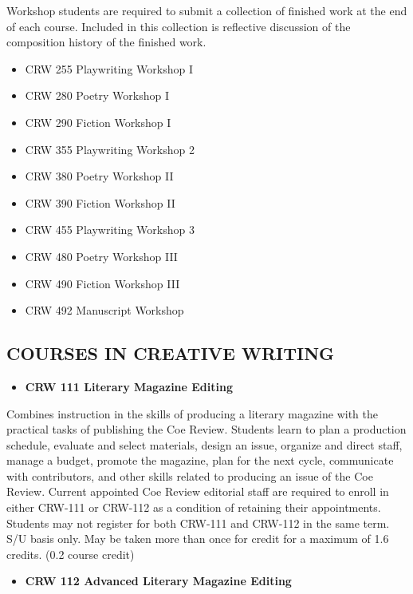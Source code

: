 \documentclass[
  letterpaper,
]{scrbook}
\providecommand{\tightlist}{%
  \setlength{\itemsep}{0pt}\setlength{\parskip}{0pt}}
\begin{document}
Workshop students are required to submit a collection of finished work
at the end of each course. Included in this collection is reflective
discussion of the composition history of the finished work.

\begin{itemize}
\tightlist
\item
  CRW 255 Playwriting Workshop I
\item
  CRW 280 Poetry Workshop I
\item
  CRW 290 Fiction Workshop I
\item
  CRW 355 Playwriting Workshop 2
\item
  CRW 380 Poetry Workshop II
\item
  CRW 390 Fiction Workshop II
\item
  CRW 455 Playwriting Workshop 3
\item
  CRW 480 Poetry Workshop III
\item
  CRW 490 Fiction Workshop III
\item
  CRW 492 Manuscript Workshop
\end{itemize}

\subsection{COURSES IN CREATIVE
WRITING}\label{sec-courses-in-creative-writing}

\begin{itemize}
\tightlist
\item
  \textbf{CRW 111 Literary Magazine Editing}
\end{itemize}

Combines instruction in the skills of producing a literary magazine with
the practical tasks of publishing the Coe Review. Students learn to plan
a production schedule, evaluate and select materials, design an issue,
organize and direct staff, manage a budget, promote the magazine, plan
for the next cycle, communicate with contributors, and other skills
related to producing an issue of the Coe Review. Current appointed Coe
Review editorial staff are required to enroll in either CRW-111 or
CRW-112 as a condition of retaining their appointments. Students may not
register for both CRW-111 and CRW-112 in the same term. S/U basis only.
May be taken more than once for credit for a maximum of 1.6 credits.
(0.2 course credit)

\begin{itemize}
\tightlist
\item
  \textbf{CRW 112 Advanced Literary Magazine Editing}
\end{itemize}
\end{document}
